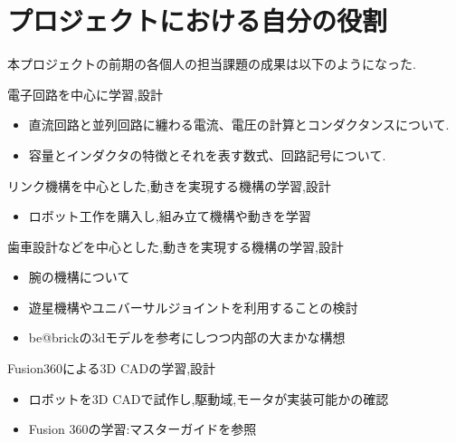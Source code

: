 \section{プロジェクトにおける自分の役割}
本プロジェクトの前期の各個人の担当課題の成果は以下のようになった.
\begin{description}
   \item[伊藤壱]\mbox{}
   \item  電子回路を中心に学習,設計
      \begin{itemize}
     \item 直流回路と並列回路に纏わる電流、電圧の計算とコンダクタンスについて.
      \end{itemize}
      \begin{itemize}
     \item 容量とインダクタの特徴とそれを表す数式、回路記号について.
      \end{itemize}
      
   \item[木島拓海]\mbox{}
      \item リンク機構を中心とした,動きを実現する機構の学習,設計
      \begin{itemize}
      \item ロボット工作を購入し,組み立て機構や動きを学習
      \end{itemize}

   \item[藤内悠]\mbox{}
    \item  歯車設計などを中心とした,動きを実現する機構の学習,設計
      \begin{itemize}
      \item 腕の機構について
      \end{itemize}
      \begin{itemize}
      \item 遊星機構やユニバーサルジョイントを利用することの検討
      \end{itemize}
      \begin{itemize}
      \item be@brickの3dモデルを参考にしつつ内部の大まかな構想
      \end{itemize}

   \item[宮嶋佑]\mbox{}
     \item Fusion360による3D CADの学習,設計
      \begin{itemize}
      \item ロボットを3D CADで試作し,駆動域,モータが実装可能かの確認
      \item Fusion 360の学習:マスターガイドを参照
      \end{itemize}
\end{description}


